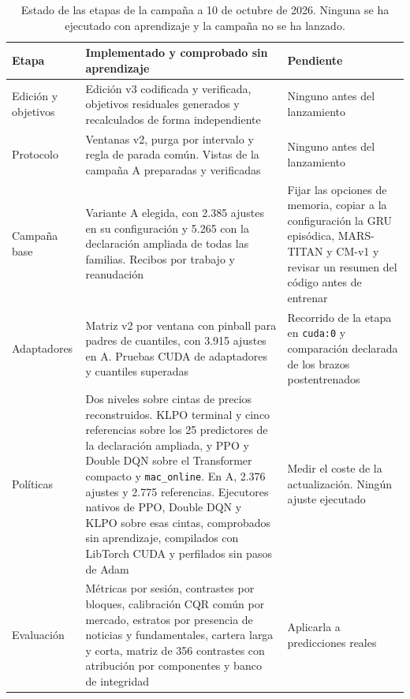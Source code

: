 \documentclass[11pt,a4paper]{report}
\begin{document}
\begin{table}[htbp]
\centering
\small
\caption{Estado de las etapas de la campaña a 10 de octubre de 2026. Ninguna se
ha ejecutado con aprendizaje y la campaña no se ha lanzado.}
\begin{tabular}{p{3cm}p{5.4cm}p{4.4cm}}
\toprule
Etapa & Implementado y comprobado sin aprendizaje & Pendiente \\
\midrule
Edición y objetivos & Edición v3 codificada y verificada, objetivos
residuales generados y recalculados de forma independiente & Ninguno antes
del lanzamiento \\
Protocolo & Ventanas v2, purga por intervalo y regla de parada común. Vistas
de la campaña A preparadas y verificadas & Ninguno antes del lanzamiento \\
Campaña base & Variante A elegida, con 2.385 ajustes en su configuración y
5.265 con la declaración ampliada de todas las familias. Recibos por trabajo y
reanudación & Fijar las opciones de memoria, copiar a la configuración la GRU
episódica, MARS-TITAN y CM-v1 y revisar un resumen del código antes de
entrenar \\
Adaptadores & Matriz v2 por ventana con pinball para padres de cuantiles,
con 3.915 ajustes en A. Pruebas CUDA de adaptadores y cuantiles superadas &
Recorrido de la etapa en \texttt{cuda:0} y comparación declarada de los
brazos postentrenados \\
Políticas & Dos niveles sobre cintas de precios reconstruidos. KLPO terminal
y cinco referencias sobre los 25 predictores de la declaración ampliada, y PPO
y Double DQN sobre el Transformer compacto y \texttt{mac\_online}. En A,
2.376 ajustes y 2.775 referencias. Ejecutores nativos de PPO, Double DQN y
KLPO sobre esas cintas, comprobados sin aprendizaje, compilados con LibTorch
CUDA y perfilados sin pasos de Adam & Medir el coste de la actualización.
Ningún ajuste ejecutado \\
Evaluación & Métricas por sesión, contrastes por bloques, calibración CQR
común por mercado, estratos por presencia de noticias y fundamentales, cartera
larga y corta, matriz de 356 contrastes con atribución por componentes y banco
de integridad & Aplicarla a predicciones reales \\
\bottomrule
\end{tabular}
\end{table}
\end{document}
